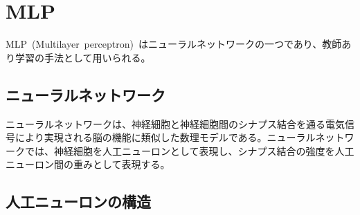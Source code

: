 
\section{MLP}

MLP~(Multilayer~perceptron)~はニューラルネットワークの一つであり、教師あり学習の手法として用いられる。

\subsection{ニューラルネットワーク}

ニューラルネットワークは、神経細胞と神経細胞間のシナプス結合を通る電気信号により実現される脳の機能に類似した数理モデルである。ニューラルネットワークでは、神経細胞を人工ニューロンとして表現し、シナプス結合の強度を人工ニューロン間の重みとして表現する。

\subsection{人工ニューロンの構造}

